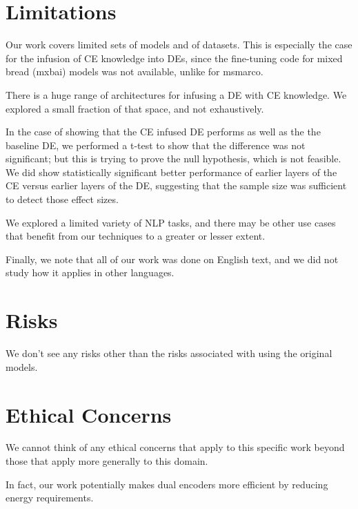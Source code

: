 \section{Limitations}

Our work covers limited sets of models and of datasets.  This is especially the case for the infusion of CE knowledge into DEs, since the fine-tuning code for mixed bread (mxbai) models was not available, unlike for msmarco.  

 There is a huge range of architectures for infusing a DE with CE knowledge.  We explored a small fraction of that space, and not exhaustively. 

 In the case of showing that the CE infused DE performs as well as the the baseline DE, we performed a t-test to show that the difference was not significant; but this is trying to prove the null hypothesis, which is not feasible.  We did show statistically significant better performance of earlier layers of the CE versus earlier layers of the DE, suggesting that the sample size was sufficient to detect those effect sizes.

 We explored a limited variety of NLP tasks, and there may be other use cases that benefit from our techniques to a greater or lesser extent.

 Finally, we note that all of our work was done on English text, and we did not study how it applies in other languages.

\section{Risks}
We don't see any risks other than the risks associated with using the original models.

\section{Ethical Concerns}

We cannot think of any ethical concerns that apply to this specific work beyond those that apply more generally to this domain.  

In fact, our work potentially makes dual encoders more efficient by reducing energy requirements.